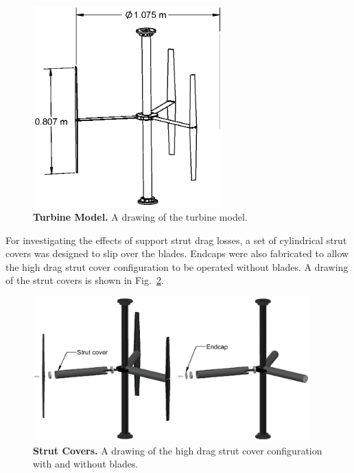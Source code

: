 \documentclass[10pt,letterpaper]{article}
\begin{document}
\begin{figure}[h]
    \includegraphics[width=0.65\textwidth]{figures/turbine.eps}

    \caption{{\bf Turbine Model.} A drawing of the turbine model.}

    \label{fig:turbine-drawing}
\end{figure}

For investigating the effects of support strut drag losses, a set of cylindrical
strut covers was designed to slip over the blades. Endcaps were also fabricated
to allow the high drag strut cover configuration to be operated without blades.
A drawing of the strut covers is shown in Fig.~\ref{fig:covers}.

\begin{figure}[h]
    \includegraphics[width=0.95\textwidth]{figures/strut_covers.eps}
    
    \caption{{\bf Strut Covers.} A drawing of the high drag strut cover
        configuration with and without blades.}
    
    \label{fig:covers}
\end{figure}
\end{document}
